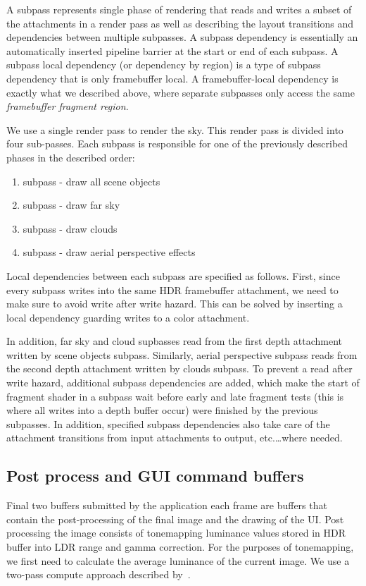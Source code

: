 \documentclass{ctuthesis}
\begin{document}
A subpass represents single phase of rendering that reads and writes a subset of the attachments in a
render pass as well as describing the layout transitions and dependencies between multiple subpasses.
A subpass dependency is essentially an automatically inserted pipeline barrier at the start or 
end of each subpass. A subpass local dependency (or dependency by region) is a type of 
subpass dependency that is only framebuffer local. A framebuffer-local dependency is exactly what
we described above, where separate subpasses only access the same \textit{framebuffer fragment region}.

We use a single render pass to render the sky. This render pass is divided into four sub-passes. Each subpass is responsible for
one of the previously described phases in the described order:
\begin{enumerate}
    \item subpass - draw all scene objects
    \item subpass - draw far sky
    \item subpass - draw clouds
    \item subpass - draw aerial perspective effects
\end{enumerate}

Local dependencies between each subpass are specified as follows. First, since every subpass writes into the same HDR 
framebuffer attachment, we need to make sure to avoid write after write hazard. This can be solved
by inserting a local dependency guarding writes to a color attachment.

In addition, far sky and cloud supbasses read from the first depth attachment written by scene 
objects subpass. Similarly, aerial perspective subpass reads from the second depth attachment written
by clouds subpass. To prevent a read after write hazard, additional subpass dependencies
are added, which make the start of fragment shader in a subpass wait before early and late fragment
tests (this is where all writes into a depth buffer occur) were finished by the previous subpasses.
In addition, specified subpass dependencies also take care of the attachment transitions from input
attachments to output, etc.\dots where needed.

\subsection{Post process and GUI command buffers}
Final two buffers submitted by the application each frame are buffers that contain the post-processing 
of the final image and the drawing of the UI. Post processing the image consists of tonemapping luminance 
values stored in HDR buffer into LDR range and gamma correction. For the purposes of tonemapping,
we first need to calculate the average luminance of the current image. We use a two-pass compute approach 
described by~\cite{tardif_2019}. 
\end{document}
